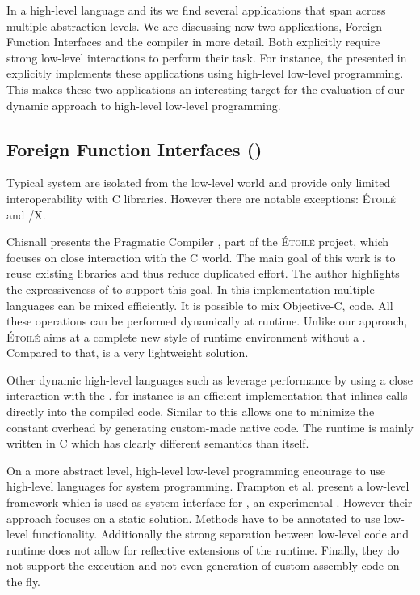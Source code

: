 In a high-level language and its \VM we find several applications that span across multiple abstraction levels.
We are discussing now two applications, Foreign Function Interfaces and the \JIT compiler in more detail.
Both explicitly require strong low-level interactions to perform their task.
For instance, the \Maxine \VM presented in  explicitly implements these applications using high-level low-level programming.
This makes these two applications an interesting target for the evaluation of our dynamic approach to high-level low-level programming.

\subsection{Foreign Function Interfaces (\FFI)}

Typical \ST system are isolated from the low-level world and provide only limited interoperability with C libraries.
However there are notable exceptions: \textsc{Étoilé} and \ST/X.

Chisnall presents the Pragmatic \ST Compiler \cite{Chis12a}, part of the \textsc{Étoilé} project, which focuses on close interaction with the C world.
The main goal of this work is to reuse existing libraries and thus reduce duplicated effort.
The author highlights the expressiveness of \ST to support this goal.
In this \ST implementation multiple languages can be mixed efficiently.
It is possible to mix Objective-C, \ST code.
All these operations can be performed dynamically at runtime.
Unlike our approach, \textsc{Étoilé} aims at a complete new style of runtime environment without a \VM.
Compared to that, \NB is a very lightweight solution.

Other dynamic high-level languages such as \Lua leverage \FFI performance by using a close interaction with the \JIT.
 for instance is an efficient \Lua implementation that inlines \FFI calls directly into the \JIT compiled code.
Similar to \NB this allows one to minimize the constant overhead by generating custom-made native code.
The \LuaJIT runtime is mainly written in C which has clearly different semantics than \Lua itself.

On a more abstract level, high-level low-level programming \cite{Fram09a} encourage to use high-level languages for system programming.
Frampton et al. present a low-level framework  which is used as system interface for \Jikes, an experimental \Java \VM.
However their approach focuses on a static solution.
Methods have to be annotated to use low-level functionality.
Additionally the strong separation between low-level code and runtime does not allow for reflective extensions of the runtime.
Finally, they do not support the execution and not even generation of custom assembly code on the fly.

